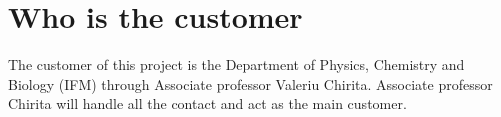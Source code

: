 \section{Who is the customer}
The customer of this project is the Department of Physics, Chemistry and Biology (IFM) through Associate professor Valeriu Chirita. Associate professor Chirita will handle all the contact and act as the main customer.